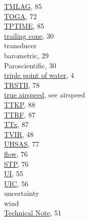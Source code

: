 \documentclass[
  english,
]{book}
\begin{document}
\href{./10-obsolete-variables.html\#tmlag}{TMLAG}, 85\\
\href{./6-air-chemistry-measurements.html\#awas-cims-qcls-toga}{TOGA},
72\\
\href{./10-obsolete-variables.html\#tptime}{TPTIME}, 85\\
\href{./4-the-state-of-the-atmosphere.html\#psx}{trailing cone}, 30\\
transducer\\
\hspace*{0.333em}\hspace*{0.333em}barometric, 29\\
\hspace*{0.333em}\hspace*{0.333em}Paroscientific, 30\\
\href{./1-introduction.html\#constants-and-symbols}{triple point of
water}, 4\\
\href{./8-radiation-variables.html\#trstx}{TRSTB}, 78\\
\href{./4-the-state-of-the-atmosphere.html\#true-airspeed}{true
airspeed}, see airspeed\\
\href{./10-obsolete-variables.html\#ttkp}{TTKP}, 88\\
\href{./10-obsolete-variables.html\#ttrf}{TTRF}, 87\\
\href{./10-obsolete-variables.html\#ttx}{TTx}, 87\\
\href{./4-the-state-of-the-atmosphere.html\#TVIR}{TVIR}, 48\\
\href{./5-cloud-physics-variables.html\#size-distribution}{UHSAS}, 77\\
\hspace*{0.333em}\hspace*{0.333em}\href{./7-aerosol-particle-measurements.html\#pflw}{flow},
76\\
\hspace*{0.333em}\hspace*{0.333em}\href{./7-aerosol-particle-measurements.html\#pflw}{STP},
76\\
\href{./4-the-state-of-the-atmosphere.html\#ui-vi-wi}{UI}, 55\\
\href{./4-the-state-of-the-atmosphere.html\#uic-vic}{UIC}, 56\\
uncertainty\\
\hspace*{0.333em}\hspace*{0.333em}wind\\
\hspace*{0.333em}\hspace*{0.333em}\hspace*{0.333em}\hspace*{0.333em}\href{./4-the-state-of-the-atmosphere.html\#wind}{Technical
Note}, 51\\
\end{document}
